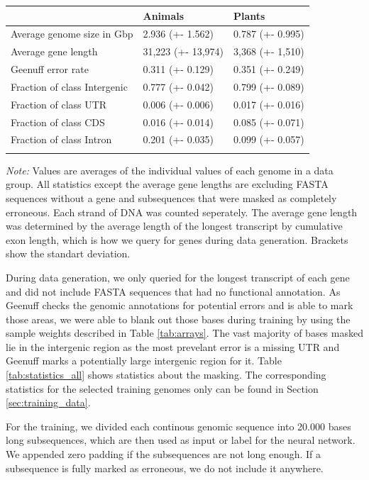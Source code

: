 \documentclass{bioinfo}
\begin{document}
\begin{methods}
\begin{table}[!t]
 {
\begin{tabular}{@{}lll@{}}
\toprule & Animals & Plants\\
\midrule
Average genome size in Gbp& 2.936 (+- 1.562) & 0.787 (+- 0.995) \\
Average gene length & 31,223 (+- 13,974)& 3,368 (+- 1,510)\\
Geenuff error rate & 0.311 (+- 0.129) & 0.351 (+- 0.249) \\
Fraction of class Intergenic  & 0.777 (+- 0.042) & 0.799 (+- 0.089) \\
Fraction of class UTR & 0.006 (+- 0.006) & 0.017 (+- 0.016) \\
Fraction of class CDS & 0.016 (+- 0.014) & 0.085 (+- 0.071) \\
Fraction of class Intron & 0.201 (+- 0.035) & 0.099 (+- 0.057) \\
\botrule
\end{tabular}}{{\it Note:} Values are averages of the individual values of each genome in a data group. All statistics except the average gene lengths are excluding FASTA sequences without a gene and subsequences that were masked as completely erroneous. Each strand of DNA was counted seperately. The average gene length was determined by the average length of the longest transcript by cumulative exon length, which is how we query for genes during data generation. Brackets show the standart deviation.}
\end{table}

During data generation, we only queried for the longest transcript of each gene and did not include FASTA sequences that had no functional annotation. As Geenuff checks the genomic annotations for potential errors and is able to mark those areas, we were able to blank out those bases during training by using the sample weights described in Table \ref{tab:arrays}. The vast majority of bases masked lie in the intergenic region as the most prevelant error is a missing UTR and Geenuff marks a potentially large intergenic region for it. Table \ref{tab:statistics_all} shows statistics about the masking. The corresponding statistics for the selected training genomes only can be found in Section \ref{sec:training_data}. 
	
For the training, we divided each continous genomic sequence into 20.000 bases long subsequences, which are then used as input or label for the neural network. We appended zero padding if the subsequences are not long enough. If a subsequence is fully marked as erroneous, we do not include it anywhere.


\end{methods}
\end{document}
